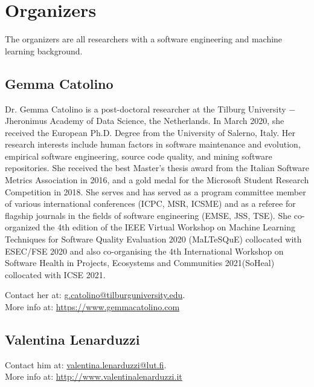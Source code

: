 
\section{Organizers}

The organizers are all researchers with a software engineering and machine learning background.

\label{sec:organizers}
\subsection{Gemma Catolino}
Dr. Gemma Catolino is a post-doctoral researcher at the Tilburg University $-$ Jheronimus Academy of Data Science, the Netherlands.
In March 2020, she received the European Ph.D. Degree from the University of Salerno, Italy. Her research interests include human factors in software maintenance and evolution, empirical software engineering, source code quality, and mining software repositories.
She received the best Master's thesis award from the Italian Software Metrics Association in 2016, and a gold medal for the Microsoft Student Research Competition in 2018. She serves and has served as a program committee member of various international conferences (ICPC, MSR, ICSME) and as a referee for flagship journals in the fields of software engineering (EMSE, JSS, TSE). She co-organized the 4th edition of the IEEE Virtual Workshop on Machine Learning Techniques for Software Quality Evaluation 2020 (MaLTeSQuE) collocated with ESEC/FSE 2020 and also co-organising the 4th International Workshop on Software Health in Projects, Ecosystems and Communities 2021(SoHeal) collocated with ICSE 2021.

\medskip
\noindent Contact her at: \href{mailto:g.catolino@tilburguniversity.edul}{g.catolino@tilburguniversity.edu}.\\
More info at: \url{https://www.gemmacatolino.com}


\subsection{Valentina Lenarduzzi}


\medskip
\noindent 
Contact him at: \href{mailto:valentina.lenarduzzi@lut.fi}{valentina.lenarduzzi@lut.fi}.\\
More info at: \url{http://www.valentinalenarduzzi.it}

